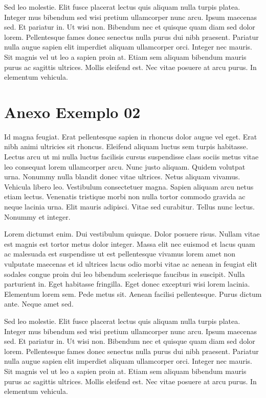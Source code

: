 Sed leo molestie. Elit fusce placerat lectus quis aliquam nulla turpis platea. Integer mus bibendum sed wisi pretium ullamcorper nunc arcu. Ipsum maecenas sed. Et pariatur in. Ut wisi non. Bibendum nec et quisque quam diam sed dolor lorem. Pellentesque fames donec senectus nulla purus dui nibh praesent. Pariatur nulla augue sapien elit imperdiet aliquam ullamcorper orci. Integer nec mauris. Sit magnis vel ut leo a sapien proin at. Etiam sem aliquam bibendum mauris purus ac sagittis ultrices. Mollis eleifend est. Nec vitae posuere at arcu purus. In elementum vehicula.

\chapter{Anexo Exemplo 02}
\noindent
Id magna feugiat. Erat pellentesque sapien in rhoncus dolor augue vel eget. Erat nibh animi ultricies sit rhoncus. Eleifend aliquam luctus sem turpis habitasse. Lectus arcu ut mi nulla luctus facilisis cursus suspendisse class sociis metus vitae leo consequat lorem ullamcorper arcu. Nunc justo aliquam. Quidem volutpat urna. Nonummy nulla blandit donec vitae ultrices. Netus aliquam vivamus. Vehicula libero leo. Vestibulum consectetuer magna. Sapien aliquam arcu netus etiam lectus. Venenatis tristique morbi non nulla tortor commodo gravida ac neque lacinia urna. Elit mauris adipisci. Vitae sed curabitur. Tellus nunc lectus. Nonummy et integer.

Lorem dictumst enim. Dui vestibulum quisque. Dolor posuere risus. Nullam vitae est magnis est tortor metus dolor integer. Massa elit nec euismod et lacus quam ac malesuada est suspendisse ut est pellentesque vivamus lorem amet non vulputate maecenas et id ultrices lacus odio morbi vitae ac aenean in feugiat elit sodales congue proin dui leo bibendum scelerisque faucibus in suscipit. Nulla parturient in. Eget habitasse fringilla. Eget donec excepturi wisi lorem lacinia. Elementum lorem sem. Pede metus sit. Aenean facilisi pellentesque. Purus dictum ante. Neque amet sed.

Sed leo molestie. Elit fusce placerat lectus quis aliquam nulla turpis platea. Integer mus bibendum sed wisi pretium ullamcorper nunc arcu. Ipsum maecenas sed. Et pariatur in. Ut wisi non. Bibendum nec et quisque quam diam sed dolor lorem. Pellentesque fames donec senectus nulla purus dui nibh praesent. Pariatur nulla augue sapien elit imperdiet aliquam ullamcorper orci. Integer nec mauris. Sit magnis vel ut leo a sapien proin at. Etiam sem aliquam bibendum mauris purus ac sagittis ultrices. Mollis eleifend est. Nec vitae posuere at arcu purus. In elementum vehicula.

